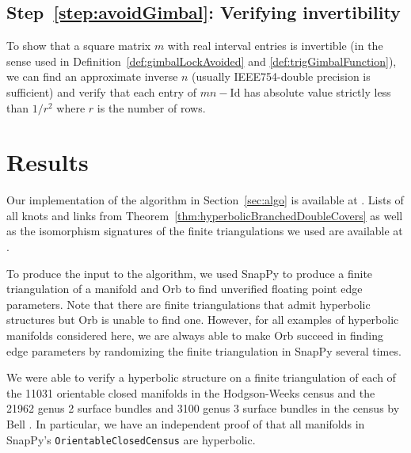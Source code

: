 \documentclass[utopia,fullpage]{nmd/article}
\begin{document}
\subsection{Step~\ref{step:avoidGimbal}: Verifying invertibility}

To show that a square matrix $m$ with real interval entries is invertible (in the sense used in Definition~\ref{def:gimbalLockAvoided} and \ref{def:trigGimbalFunction}), we can find an approximate inverse $n$ (usually IEEE754-double precision is sufficient) and verify that each entry of $mn-\mathrm{Id}$ has absolute value strictly less than $1/r^2$ where $r$ is the number of rows.

\section{Results}  \label{sec:results}

Our implementation of the algorithm in Section~\ref{sec:algo} is available at \cite{veriClosedRepo}. Lists of all knots and links from Theorem~\ref{thm:hyperbolicBranchedDoubleCovers} as well as the isomorphism signatures of the finite triangulations we used are available at \cite{veriClosedData}.

To produce the input to the algorithm, we used SnapPy \cite{SnapPy} to produce a finite triangulation of a manifold and Orb \cite{orb} to find unverified floating point edge parameters. Note that there are finite triangulations that admit hyperbolic structures but Orb is unable to find one. However, for all examples of hyperbolic manifolds considered here, we are always able to make Orb succeed in finding edge parameters by randomizing the finite triangulation in SnapPy several times.

We were able to verify a hyperbolic structure on a finite triangulation of each of the 11031 orientable closed manifolds in the Hodgson-Weeks census \cite{hwcensus} and the 21962 genus 2 surface bundles and 3100 genus 3 surface bundles in the census by Bell \cite{bellBundleCensus}. In particular, we have an independent proof of \cite[Theorem~5.2]{hikmot} that all manifolds in SnapPy's \texttt{OrientableClosedCensus} are hyperbolic.
\end{document}
